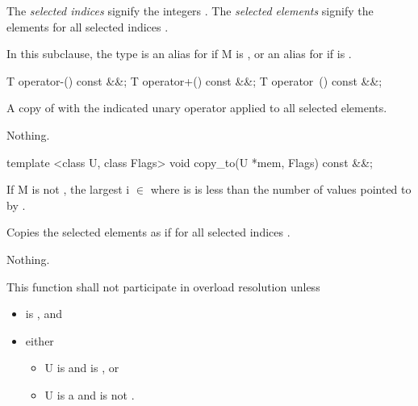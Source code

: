 \pnum The \emph{selected indices} signify the integers .
The \emph{selected elements} signify the elements  for all selected indices .

\pnum In this subclause, the type  is an alias for  if \type M is \bool, or an alias for  if  is \true.

\pnum{}

\begin{itemdecl}
T operator-() const &&;
T operator+() const &&;
T operator~() const &&;
\end{itemdecl}
\begin{itemdescr}
  \pnum\returns A copy of  with the indicated unary operator applied to all selected elements.

  \pnum\throws Nothing.
\end{itemdescr}

\begin{itemdecl}
template <class U, class Flags> void copy_to(U *mem, Flags) const &&;
\end{itemdecl}
\begin{itemdescr}
   If \type M is not \bool, the largest i $\in$ \code{[0, M::size())} where  is \true is less than the number of values pointed to by .

  \pnum\effects Copies the selected elements as if  for all selected indices .

  \pnum\throws Nothing.

  \pnum\remarks This function shall not participate in overload resolution unless
  \begin{itemize}
      \item {} is \true, and
      \item either
          \begin{itemize}
              \item \type U is \bool and  is \bool, or
              \item \type U is a \realArithmeticType and  is not \bool.
          \end{itemize}
  \end{itemize}
\end{itemdescr}

